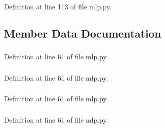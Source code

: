Definition at line 113 of file mlp.py.



\subsection{Member Data Documentation}
\hypertarget{classmlp_1_1mlp_aab9e6c1e9b3661fa3f276d09baf27144}{
\subsubsection[{allpercent}]{}}
\label{classmlp_1_1mlp_aab9e6c1e9b3661fa3f276d09baf27144}


Definition at line 61 of file mlp.py.

\hypertarget{classmlp_1_1mlp_a2f75a4b3429e0307568fc45d7e6950da}{
\subsubsection[{beta}]{}}
\label{classmlp_1_1mlp_a2f75a4b3429e0307568fc45d7e6950da}


Definition at line 61 of file mlp.py.

\hypertarget{classmlp_1_1mlp_ae97e72b20c044203c2a86adc234eb9c5}{
\subsubsection[{classes}]{}}
\label{classmlp_1_1mlp_ae97e72b20c044203c2a86adc234eb9c5}


Definition at line 61 of file mlp.py.

\hypertarget{classmlp_1_1mlp_a0573cbd708236e8af5fb46edc9c36660}{
\subsubsection[{cm}]{}}
\label{classmlp_1_1mlp_a0573cbd708236e8af5fb46edc9c36660}


Definition at line 61 of file mlp.py.

